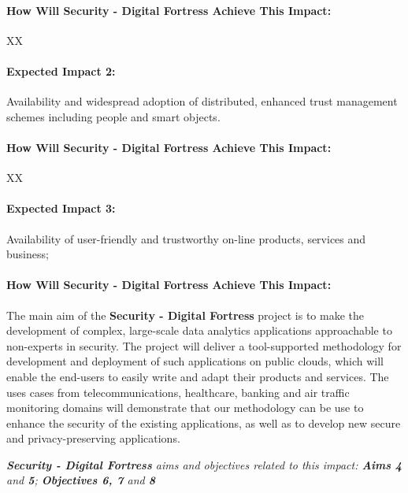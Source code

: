 \documentclass[a4paper,11pt]{article}
\newcommand{\project}[1]{\textbf{#1}\xspace}
\newcommand{\SECURITY}{\project{Security - Digital Fortress}}
\newcommand{\TheProject}{\SECURITY}
\begin{document}
\begin{mdframed}[backgroundcolor=gray!10]
\paragraph{How Will \TheProject{} Achieve This Impact:}
XX
\end{mdframed}

\begin{mdframed}[backgroundcolor=blue!5]
\paragraph{Expected Impact 2:}
Availability and widespread adoption of distributed, enhanced trust management schemes including people and smart objects.
\end{mdframed}

\begin{mdframed}[backgroundcolor=gray!10]
\paragraph{How Will \TheProject{} Achieve This Impact:}
XX
\end{mdframed}

\begin{mdframed}[backgroundcolor=blue!5]
\paragraph{Expected Impact 3:}
Availability of user-friendly and trustworthy on-line products, services and business;
\end{mdframed}

\begin{mdframed}[backgroundcolor=gray!10]
\paragraph{How Will \TheProject{} Achieve This Impact:}
The main aim of the \TheProject{} project is to make the development of complex, large-scale data analytics applications approachable to non-experts in security. The project will deliver a tool-supported methodology for development and deployment of such applications on public clouds, which will enable the end-users to easily write and adapt their products and services. The uses cases from telecommunications, healthcare, banking and air traffic monitoring domains will demonstrate that our methodology can be use to enhance the security of the existing applications, as well as to develop new secure and privacy-preserving applications.

\emph{\TheProject{} aims and objectives related to this impact: \textbf{Aims 4}  and \textbf{5}; \textbf{Objectives 6, 7} and \textbf{8} }

\end{mdframed}
\end{document}
